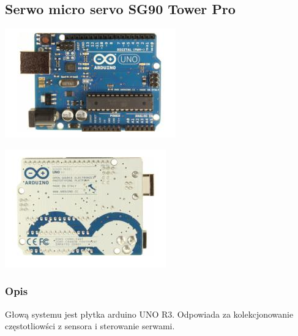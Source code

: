 \documentclass[12pt]{article}
\begin{document}
\subsection{Serwo micro servo SG90 Tower Pro}
\begin{center}
\begin{minipage}[H]{.85\textwidth}
    \includegraphics[width=1.0\linewidth]{ard_front.png}
\end{minipage}
\begin{minipage}[H]{.85\textwidth}
    \includegraphics[width=1.0\linewidth]{ard_back.png}
\end{minipage}
\end{center}
\subsubsection{Opis}
Głową systemu  jest płytka arduino UNO R3.  Odpowiada za kolekcjonowanie częstotliowści z sensora i sterowanie serwami.
\end{document}
